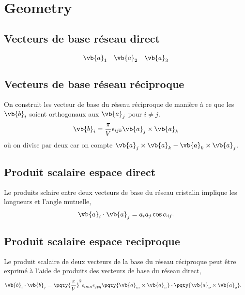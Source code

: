 
\section{Geometry} %
\label{sec:geometry}


\subsection{Vecteurs de base réseau direct}

\begin{align*}
	\vb{a}_1 && \vb{a}_2 && \vb{a}_3
\end{align*} 

\subsection{Vecteurs de base réseau réciproque}

On construit les vecteur de base du réseau réciproque de manière à ce que les $\vb{b}_i$ soient orthogonaux aux $\vb{a}_j$ pour $i \neq j$. 
\begin{align*}
	\vb{b}_i = \frac{\pi}{V} \epsilon_{ijk} \vb{a}_j \times \vb{a}_k
\end{align*} où on divise par deux car on compte $\vb{a}_j \times \vb{a}_k - \vb{a}_k \times \vb{a}_j$. 

\subsection{Produit scalaire espace direct}
\label{ssec:dotRR}

Le produits sclaire entre deux vecteurs de base du réseau cristalin implique les longueurs et l'angle mutuelle,
\begin{align*}
	\vb{a}_i\cdot\vb{a}_j = a_i a_j \cos\alpha_{ij}.
\end{align*}

\subsection{Produit scalaire espace reciproque}
Le produit scalaire de deux vecteurs de la base du réseau réciproque peut être exprimé à l'aide de produits des vecteurs de base du réseau direct,
\begin{align*}
	\vb{b}_i \cdot \vb{b}_j 
	&= \pqty{\frac{\pi}{V}}^2 \epsilon_{imn} \epsilon_{jpq} \pqty{ \vb{a}_m \times \vb{a}_n}\cdot\pqty{ \vb{a}_p \times \vb{a}_q}.
\end{align*}

